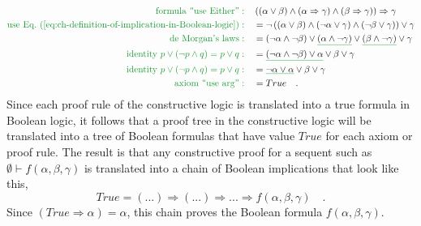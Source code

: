 \begin{align*}
{\color{greenunder}\text{formula \textsf{``}use Either\textsf{''}}:}\quad & \left(\left(\alpha\vee\beta\right)\wedge\left(\alpha\Rightarrow\gamma\right)\wedge\left(\beta\Rightarrow\gamma\right)\right)\Rightarrow\gamma\\
{\color{greenunder}\text{use Eq.~(\ref{eq:ch-definition-of-implication-in-Boolean-logic})}:}\quad & =\neg\left(\left(\alpha\vee\beta\right)\wedge\left(\neg\alpha\vee\gamma\right)\wedge\left(\neg\beta\vee\gamma\right)\right)\vee\gamma\\
{\color{greenunder}\text{de Morgan\textsf{'}s laws}:}\quad & =\left(\neg\alpha\wedge\neg\beta\right)\vee\gunderline{\left(\alpha\wedge\neg\gamma\right)}\vee\gunderline{\left(\beta\wedge\neg\gamma\right)}\vee\gamma\\
{\color{greenunder}\text{identity }p\vee(\neg p\wedge q)=p\vee q:}\quad & =\gunderline{\left(\neg\alpha\wedge\neg\beta\right)\vee\alpha}\vee\beta\vee\gamma\\
{\color{greenunder}\text{identity }p\vee(\neg p\wedge q)=p\vee q:}\quad & =\gunderline{\neg\alpha\vee\alpha}\vee\beta\vee\gamma\\
{\color{greenunder}\text{axiom \textsf{``}use arg\textsf{''}}:}\quad & =True\quad.
\end{align*}
Since each proof rule of the constructive logic is translated into
a true formula in Boolean logic, it follows that a proof tree in the
constructive logic will be translated into a tree of Boolean formulas
that have value $True$ for each axiom or proof rule. The result is
that any constructive proof for a sequent such as $\emptyset\vdash f(\alpha,\beta,\gamma)$
is translated into a chain of Boolean implications that look like
this,
\[
True=(...)\Rightarrow(...)\Rightarrow...\Rightarrow f(\alpha,\beta,\gamma)\quad.
\]
Since $\left(True\Rightarrow\alpha\right)=\alpha$, this chain proves
the Boolean formula $f(\alpha,\beta,\gamma)$.

